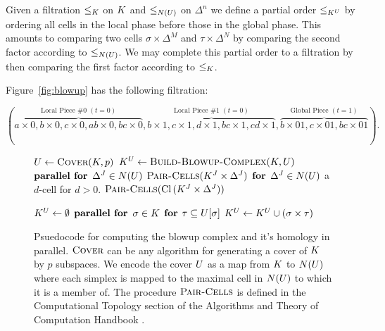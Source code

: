 Given a filtration $\leq_{K}$ on $K$ and $\leq_{N(U)}$ on $\Delta^n$ we define a partial order $\leq_{{K^U}}$ by 
ordering all cells in the local phase before those in the global phase. This amounts to 
comparing two cells $\sigma \times \Delta^M$ and $\tau \times \Delta^N$ by  
comparing the second factor according to $\leq_{N(U)}$. We may complete this partial order to a filtration by then comparing the 
first factor according to $\leq_{K}$. 
\begin{example}
Figure~\ref{fig:blowup} has the following filtration: 

\begin{equation*}
(\overbrace{a \times 0, b \times 0 ,c \times 0,  ab \times 0, bc \times 0}^
{\textrm{Local Piece \#0 } (t=0)},
\overbrace{b \times 1 , c \times 1, d \times 1, bc \times 1, cd \times 1}^
{\textrm{Local Piece \#1 }(t=0)},
\overbrace{b \times 01, c \times 01, bc \times 01}^
{\textrm{Global Piece } (t=1)}).
\end{equation*}

\end{example}
\begin{figure}
\begin{multicols}{2}
{
\begin{codebox}
 \li  $U \gets \textnormal{\scshape Cover}(K, p)$
 \li  $K^{U} \gets \textnormal{\scshape Build-Blowup-Complex}(K, U)$
 \li  $\textbf{parallel for}$   $\Delta^J \in N(U)$
 \li  \Do $\textnormal{\scshape Pair-Cells}(K^{J} \times \Delta^{J})$
      \End
 \li $\textbf{for}$ $\Delta^J \in N(U)$ a $d$-cell for $d > 0$.
 \li  \Do $\textnormal{\scshape Pair-Cells}(\operatorname{Cl}{(K^{J} \times \Delta^{J})})$ 
\end{codebox}
}
{
\begin{codebox}
\li $K^{U} \gets \emptyset$
\li $\textbf{parallel for}$ $\sigma \in K$
\li \Do $\textbf{for}$ $\tau \subseteq U[\sigma]$
\li \Do $K^{U} \gets K^{U} \cup (\sigma \times \tau)$ 
\end{codebox}
}
\end{multicols}
\caption{Psuedocode for computing the blowup complex and it's homology in parallel. $\textnormal{\scshape Cover}$ can be any algorithm for generating a cover of $K$ by $p$ subspaces. We encode the cover $U$ as a map from $K$ to $N(U)$ where each simplex is mapped to the maximal cell in $N(U)$ to which it is a member of. The procedure $\textnormal{\scshape Pair-Cells}$ is defined in the Computational Topology section of the Algorithms and Theory of Computation Handbook \cite{z-ct-10}.}
\label{fig:multicore-code}
\end{figure}
